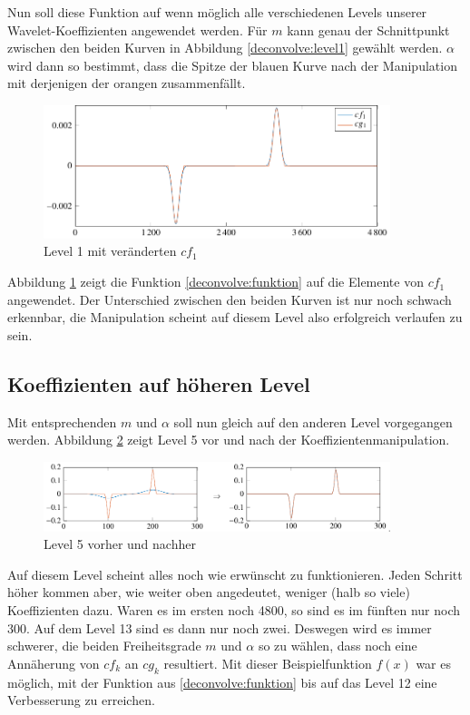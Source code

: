 Nun soll diese Funktion auf wenn möglich alle verschiedenen Levels unserer Wavelet-Koeffizien\-ten angewendet werden.
Für $m$ kann genau der Schnittpunkt zwischen den beiden Kurven in Abbildung \ref{deconvolve:level1} gewählt werden.
$\alpha$ wird dann so bestimmt, dass die Spitze der blauen Kurve nach der Manipulation mit derjenigen der orangen zusammenfällt.
\begin{figure}
\centering
\includegraphics[width=0.9\textwidth]{./papers/deconvolve/pictures/level/level1_n.pdf}
\caption{Level 1 mit veränderten $cf_1$\label{deconvolve:level1_n}}
\end{figure}

Abbildung \ref{deconvolve:level1_n} zeigt die Funktion \eqref{deconvolve:funktion} auf die Elemente von $cf_1$ angewendet.
Der Unterschied zwischen den beiden Kurven ist nur noch schwach erkennbar, die Manipulation scheint auf diesem Level also erfolgreich verlaufen zu sein.

\subsection{Koeffizienten auf höheren Level}

Mit entsprechenden $m$ und $\alpha$ soll nun gleich auf den anderen Level vorgegangen werden.
Abbildung \ref{deconvolve:level5} zeigt Level 5 vor und nach der Koeffizientenmanipulation.
\begin{figure}
\centering
\includegraphics[width=0.9\textwidth]{./papers/deconvolve/pictures/level/level5.pdf}
\caption{Level 5 vorher und nachher\label{deconvolve:level5}}
\end{figure}

Auf diesem Level scheint alles noch wie erwünscht zu funktionieren.
Jeden Schritt höher kommen aber, wie weiter oben angedeutet, weniger (halb so viele) Koeffizienten dazu.
Waren es im ersten noch 4800, so sind es im fünften nur noch 300.
Auf dem Level 13 sind es dann nur noch zwei.
Deswegen wird es immer schwerer, die beiden Freiheitsgrade $m$ und $\alpha$ so zu wählen, dass noch eine Annäherung von $cf_k$ an $cg_k$ resultiert.
Mit dieser Beispielfunktion $f(x)$ war es möglich, mit der Funktion aus \eqref{deconvolve:funktion} bis auf das Level 12 eine Verbesserung zu erreichen.

